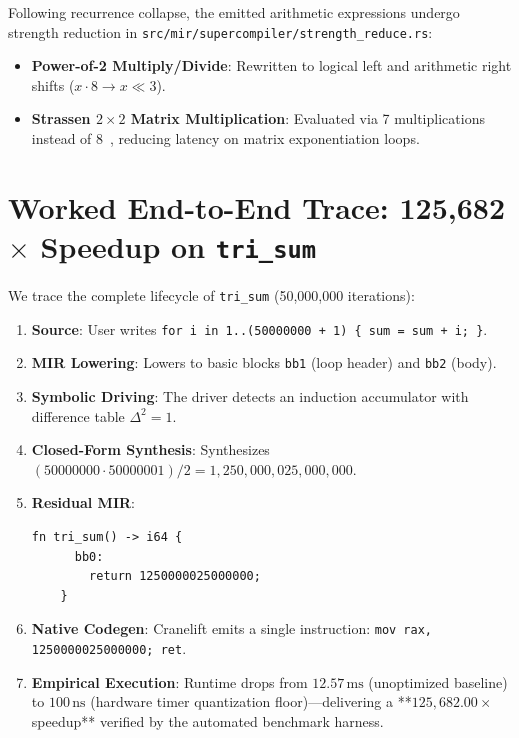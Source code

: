 Following recurrence collapse, the emitted arithmetic expressions undergo strength reduction in \texttt{src/mir/supercompiler/strength\_reduce.rs}:
\begin{itemize}
    \item \textbf{Power-of-2 Multiply/Divide}: Rewritten to logical left and arithmetic right shifts ($x \cdot 8 \to x \ll 3$).
    \item \textbf{Strassen $2 \times 2$ Matrix Multiplication}: Evaluated via 7 multiplications instead of 8~\cite{strassen1969gaussian}, reducing latency on matrix exponentiation loops.
\end{itemize}

\section{Worked End-to-End Trace: 125,682$\times$ Speedup on \texttt{tri\_sum}}
\label{sec:rec:worked_tri_sum}

We trace the complete lifecycle of \texttt{tri\_sum} (50,000,000 iterations):
\begin{enumerate}
    \item \textbf{Source}: User writes \texttt{for i in 1..(50000000 + 1) \{ sum = sum + i; \}}.
    \item \textbf{MIR Lowering}: Lowers to basic blocks \texttt{bb1} (loop header) and \texttt{bb2} (body).
    \item \textbf{Symbolic Driving}: The driver detects an induction accumulator with difference table $\Delta^2 = 1$.
    \item \textbf{Closed-Form Synthesis}: Synthesizes $(50000000 \cdot 50000001) / 2 = 1,250,000,025,000,000$.
    \item \textbf{Residual MIR}:
    \begin{lstlisting}[caption={Residual MIR Emitted for \texttt{tri\_sum}.}]
    fn tri_sum() -> i64 {
      bb0:
        return 1250000025000000;
    }
    \end{lstlisting}
    \item \textbf{Native Codegen}: Cranelift emits a single instruction: \texttt{mov rax, 1250000025000000; ret}.
    \item \textbf{Empirical Execution}: Runtime drops from $12.57\,\text{ms}$ (unoptimized baseline) to $100\,\text{ns}$ (hardware timer quantization floor)---delivering a **$125,682.00\times$ speedup** verified by the automated benchmark harness.
\end{enumerate}


